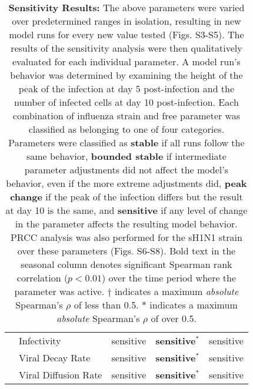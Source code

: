 \documentclass[preprint,10pt,numbers]{elsarticle}
\begin{document}
\begin{table}[!ht]
\begin{center}
\begin{tabular}{| c | l | c c c |}
  & Infectivity & \cellcolor{red!40}sensitive & \cellcolor{red!40}\textbf{sensitive$^*$} & \cellcolor{red!40}sensitive \\
  & Viral Decay Rate & \cellcolor{red!40}sensitive & \cellcolor{red!40}\textbf{sensitive$^*$} & \cellcolor{red!40}sensitive \\
  & Viral Diffusion Rate & \cellcolor{red!40}sensitive & \cellcolor{red!40}\textbf{sensitive$^*$} & \cellcolor{red!40}sensitive \\
  \hline  
\end{tabular}
\caption{\textbf{Sensitivity Results:} The above parameters were varied over predetermined ranges in isolation, resulting in new model runs for every new value tested (Figs. S3-S5).  The results of the sensitivity analysis were then qualitatively evaluated for each individual parameter.  A model run's behavior was determined by examining the height of the peak of the infection at day 5 post-infection and the number of infected cells at day 10 post-infection.  Each combination of influenza strain and free parameter was classified as belonging to one of four categories.  Parameters were classified as \textbf{stable} if all runs follow the same behavior, \textbf{bounded stable} if intermediate parameter adjustments did not affect the model's behavior, even if the more extreme adjustments did, \textbf{peak change} if the peak of the infection differs but the result at day 10 is the same, and \textbf{sensitive} if any level of change in the parameter affects the resulting model behavior.  PRCC analysis was also performed for the sH1N1 strain over these parameters (Figs. S6-S8).  Bold text in the seasonal column denotes significant Spearman rank correlation ($p < 0.01$) over the time period where the parameter was active. $\dagger$ indicates a maximum \textit{absolute} Spearman's $\rho$ of less than 0.5.  $*$ indicates a maximum \textit{absolute} Spearman's $\rho$ of over 0.5.}
\label{tab:sensitivity}
\end{center}
\end{table}
\end{document}
